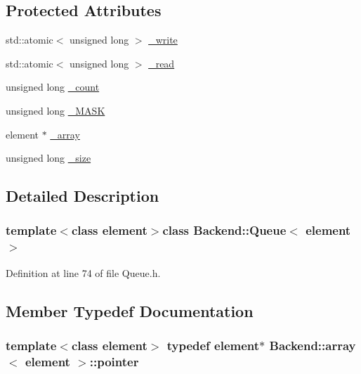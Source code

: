 \subsection*{Protected Attributes}
\begin{DoxyCompactItemize}
\item 
std\+::atomic$<$ unsigned long $>$ \hyperlink{classBackend_1_1Queue_ab3d5c4738092cf356b36c56f6ab61554}{\+\_\+write}
\item 
std\+::atomic$<$ unsigned long $>$ \hyperlink{classBackend_1_1Queue_a508eb8c4fedb73fc4abbf26353bdfd82}{\+\_\+read}
\item 
unsigned long \hyperlink{classBackend_1_1Queue_ab49d17e24dc0f8a2e5e44c182c240249}{\+\_\+count}
\item 
unsigned long \hyperlink{classBackend_1_1Queue_ab665bcab528d6bad6c4faab1ae0fc1b4}{\+\_\+\+M\+A\+S\+K}
\item 
element $\ast$ \hyperlink{classBackend_1_1array_ac588c1e30c2c4748bc9a5bb12b9320af}{\+\_\+array}
\item 
unsigned long \hyperlink{classBackend_1_1array_ae51d64e87b42931946111c28b98e8a18}{\+\_\+size}
\end{DoxyCompactItemize}


\subsection{Detailed Description}
\subsubsection*{template$<$class element$>$class Backend\+::\+Queue$<$ element $>$}



Definition at line 74 of file Queue.\+h.



\subsection{Member Typedef Documentation}
\hypertarget{classBackend_1_1array_a6d8785dc8b979153ef122f4e3bad1408}{
\subsubsection[{pointer}]{\setlength{\rightskip}{0pt plus 5cm}template$<$class element$>$ typedef element$\ast$ {\bf Backend\+::array}$<$ element $>$\+::{\bf pointer}\hspace{0.3cm}{\ttfamily [inherited]}}}\label{classBackend_1_1array_a6d8785dc8b979153ef122f4e3bad1408}


